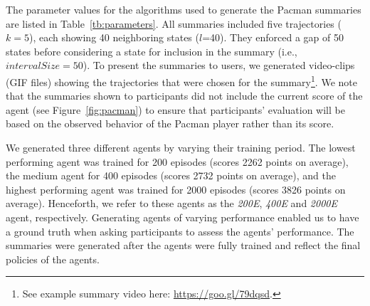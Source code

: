 The parameter values for the algorithms used to generate the Pacman summaries are listed in Table~\ref{tb:parameters}.  All summaries included five trajectories ($k=5$), each showing 40 neighboring states ($l$=40). 
They enforced a gap of 50 states before considering a state for inclusion in the summary (i.e., $intervalSize = 50$).  To present the summaries to users, we generated video-clips (GIF files) showing the trajectories that were chosen for the summary\footnote{See example summary video here: \url{https://goo.gl/79dqsd}.}. We note that the summaries shown to participants did not include the current score of the agent (see Figure~\ref{fig:pacman}) to ensure that participants' evaluation will  be based on the observed behavior of the Pacman player rather than its score.

We generated three different agents by varying their training period. The lowest performing agent was trained for 200 episodes (scores 2262 points on average), the medium agent for 400 episodes (scores 2732 points on average), and the highest performing agent was trained for 2000 episodes (scores 3826 points on average). Henceforth, we refer to these agents as the \emph{200E}, \emph{400E} and \emph{2000E} agent, respectively. Generating agents of varying performance enabled us to have a ground truth when asking participants to assess the agents' performance. The summaries were generated after the agents were fully trained and reflect the final policies of the agents.  




